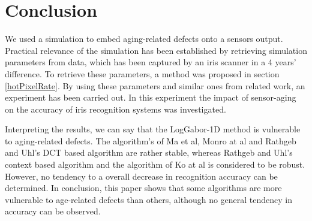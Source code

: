\documentclass[10pt,twocolumn,letterpaper]{article}
\begin{document}
 
 \section{Conclusion}
 \label{conclusion}
 We used a simulation to embed aging-related defects onto a sensors output. Practical relevance of the simulation has been established by retrieving simulation parameters from data, which has been captured by an iris scanner in a 4 years' difference. To retrieve these parameters, a method was proposed in section \ref{hotPixelRate}. By using these parameters and similar ones from related work, an experiment has been carried out. In this experiment the impact of sensor-aging on the accuracy of iris recognition systems was investigated.
 
 Interpreting the results, we can say that the LogGabor-1D method is vulnerable to aging-related defects. The algorithm's of Ma et al, Monro at al and Rathgeb and Uhl's DCT based algorithm are rather stable, whereas Rathgeb and Uhl's context based algorithm and the algorithm of Ko at al is considered to be robust. However, no tendency to a overall decrease in recognition accuracy can be determined. 
 In conclusion, this paper shows that some algorithms are more vulnerable to age-related defects than others, although no general tendency in accuracy can be observed. 
 




{\small


}

\end{document}
